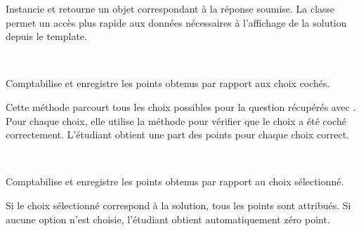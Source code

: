 \documentclass[a4paper,11pt,openany,oneside]{sphinxmanual}
\begin{document}
\begin{fulllineitems}
\begin{fulllineitems}
\label{database:quiz.models.QcmSubmit.build_correct}
Instancie et retourne un objet  correspondant à la réponse soumise.
La classe  permet un accès plus rapide aux données nécessaires
à l'affichage de la solution depuis le template.

\end{fulllineitems}


\end{fulllineitems}


\begin{fulllineitems}
\label{database:quiz.models.QcmSubmitMulti}~

\begin{fulllineitems}
\label{database:quiz.models.QcmSubmitMulti.save_result}
Comptabilise et enregistre les points obtenus par rapport aux choix cochés.

Cette méthode parcourt tous les choix possibles pour la question
 récupérés avec . Pour chaque
choix, elle utilise la méthode  pour
vérifier que le choix a été coché correctement. L'étudiant obtient une part
des points pour chaque choix correct.

\end{fulllineitems}


\end{fulllineitems}


\begin{fulllineitems}
\label{database:quiz.models.QcmSubmitOne}~

\begin{fulllineitems}
\label{database:quiz.models.QcmSubmitOne.save_result}
Comptabilise et enregistre les points obtenus par rapport au choix sélectionné.

Si le choix sélectionné correspond à la solution, tous les points sont attribués.
Si aucune option n'est choisie, l'étudiant obtient automatiquement zéro point.

\end{fulllineitems}


\end{fulllineitems}
\end{document}
